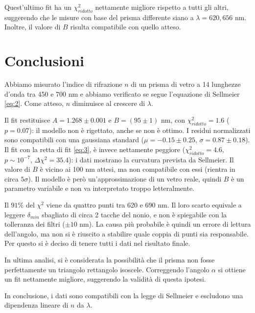 \documentclass[10pt,twocolumn]{article}
\begin{document}
Quest'ultimo fit ha un $\chi^2_{ridotto}$ nettamente migliore rispetto a tutti gli altri, suggerendo che le misure con base del prisma differente siano a $\lambda = 620, 656$ nm. Inoltre, il valore di $B$ risulta compatibile con quello atteso.

\section{Conclusioni}
\noindent Abbiamo misurato l'indice di rifrazione $n$ di un prisma di vetro a 14 lunghezze d'onda tra 450 e 700 nm e abbiamo verificato se segue l'equazione di Sellmeier \eqref{eq:2}. Come atteso, $n$ diminuisce al crescere di $\lambda$. 

Il fit restituisce $A=1.268\pm0.001$ e $B=(95\pm1)$ nm, con $\chi^2_{ridotto}=1.6$ ($p=0.07$): il modello non è rigettato, anche se non è ottimo. I residui normalizzati sono compatibili con una gaussiana standard ($\mu=-0.15\pm0.25$, $\sigma=0.87\pm0.18$). Il fit con la retta di fit \eqref{eq:3}, è invece nettamente peggiore ($\chi^2_{ridotto}=4.6$, $p\sim10^{-7}$, $\Delta\chi^2=35.4$): i dati mostrano la curvatura prevista da Sellmeier. 
Il valore di $B$ è vicino ai 100 nm attesi, ma non compatibile con essi (rientra in circa $5\sigma$). Il modello è però un'approssimazione di un vetro reale, quindi $B$ è un parametro variabile e non va interpretato troppo letteralmente.

\noindent Il $91\%$ del $\chi^2$ viene da quattro punti tra 620 e 690 nm. Il loro scarto equivale a leggere $\delta_{min}$ sbagliato di circa 2 tacche del nonio, e non è spiegabile con la tolleranza dei filtri ($\pm10$ nm). La causa più probabile è quindi un errore di lettura dell'angolo, ma non si è riuscito a stabilire quale coppia di punti sia responsabile. 
Per questo si è deciso di tenere tutti i dati nel risultato finale. 

In ultima analisi, si è considerata la possibilità che il prisma non fosse perfettamente un triangolo rettangolo isoscele. Correggendo l'angolo $\alpha$ si ottiene un fit nettamente migliore, suggerendo la validità di questa ipotesi. 

In conclusione, i dati sono compatibili con la legge di Sellmeier e escludono una dipendenza lineare di $n$ da $\lambda$.
    
    
\end{document}
